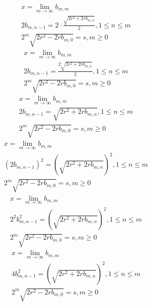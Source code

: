 \documentclass[a4paper,12pt]{report}
\begin{document}
\begin{subequations}
\begin{gather}
x = \lim \limits_{m \to \infty} b_{m,m} \\
2b_{m,n-1} = 2 \cdot \frac{\sqrt{2r^2 + 2rb_{m,n}}}{2}, 1 \leq n \leq m \\
2^m \sqrt{2r^2 - 2rb_{m,0}} = s, m \geq 0
\end{gather}
\end{subequations}
\begin{subequations}
\begin{gather}
x = \lim \limits_{m \to \infty} b_{m,m} \\
2b_{m,n-1} = \frac{2 \sqrt{2r^2 + 2rb_{m,n}}}{2}, 1 \leq n \leq m \\
2^m \sqrt{2r^2 - 2rb_{m,0}} = s, m \geq 0
\end{gather}
\end{subequations}
\begin{subequations}
\begin{gather}
x = \lim \limits_{m \to \infty} b_{m,m} \\
2b_{m,n-1} = \sqrt{2r^2 + 2rb_{m,n}}, 1 \leq n \leq m \\
2^m \sqrt{2r^2 - 2rb_{m,0}} = s, m \geq 0
\end{gather}
\end{subequations}
\begin{subequations}
\begin{gather}
x = \lim \limits_{m \to \infty} b_{m,m} \\
(2b_{m,n-1})^2 = \left(\sqrt{2r^2 + 2rb_{m,n}}\right)^2, 1 \leq n \leq m \\
2^m \sqrt{2r^2 - 2rb_{m,0}} = s, m \geq 0
\end{gather}
\end{subequations}
\begin{subequations}
\begin{gather}
x = \lim \limits_{m \to \infty} b_{m,m} \\
2^2b_{m,n-1}^2 = \left(\sqrt{2r^2 + 2rb_{m,n}}\right)^2, 1 \leq n \leq m \\
2^m \sqrt{2r^2 - 2rb_{m,0}} = s, m \geq 0
\end{gather}
\end{subequations}
\begin{subequations}
\begin{gather}
x = \lim \limits_{m \to \infty} b_{m,m} \\
4b_{m,n-1}^2 = \left(\sqrt{2r^2 + 2rb_{m,n}}\right)^2, 1 \leq n \leq m \\
2^m \sqrt{2r^2 - 2rb_{m,0}} = s, m \geq 0
\end{gather}
\end{subequations}
\end{document}
